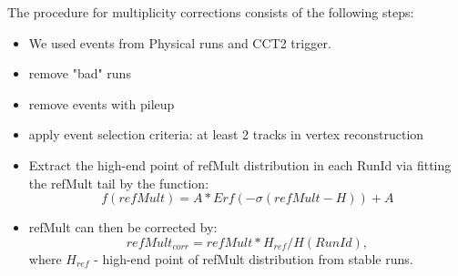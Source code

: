    The procedure for multiplicity corrections consists of the following steps:
    \begin{itemize}
        \item We used events from Physical runs and CCT2 trigger.
        \item remove "bad" runs
        \item remove events with pileup
        \item apply event selection criteria: at least 2 tracks in vertex reconstruction
        \item Extract the high-end point of refMult distribution in each RunId via fitting the refMult tail by the function:
            \begin{equation}\label{ErrFunct}
                f(refMult)=A*Erf(-\sigma(refMult-H))+A
            \end{equation}
        \item refMult can then be corrected by:
            \begin{equation}\label{ErrFunct}
                refMult_{corr} = refMult * H_{ref} / H(RunId),
            \end{equation}
        where $H_{ref}$ - high-end point of refMult distribution from stable runs. 


    \end{itemize}
